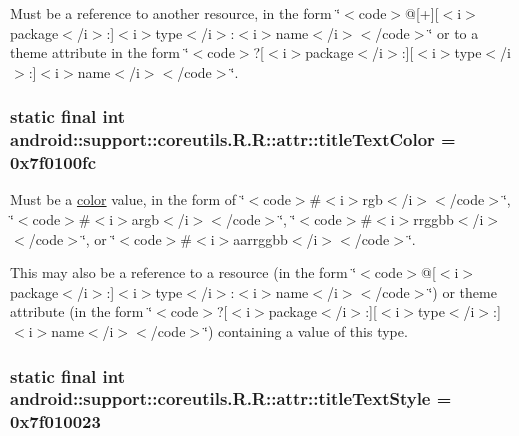 Must be a reference to another resource, in the form \char`\"{}$<$code$>$@\mbox{[}+\mbox{]}\mbox{[}$<$i$>$package$<$/i$>$:\mbox{]}$<$i$>$type$<$/i$>$:$<$i$>$name$<$/i$>$$<$/code$>$\char`\"{} or to a theme attribute in the form \char`\"{}$<$code$>$?\mbox{[}$<$i$>$package$<$/i$>$:\mbox{]}\mbox{[}$<$i$>$type$<$/i$>$:\mbox{]}$<$i$>$name$<$/i$>$$<$/code$>$\char`\"{}. \hypertarget{classandroid_1_1support_1_1coreutils_1_1_r_1_1attr_373e1d379bb1ab1c3df7a328d054c376}{
\subsubsection[{titleTextColor}]{\setlength{\rightskip}{0pt plus 5cm}static final int android::support::coreutils.R.R::attr::titleTextColor = 0x7f0100fc}}
\label{classandroid_1_1support_1_1coreutils_1_1_r_1_1attr_373e1d379bb1ab1c3df7a328d054c376}


Must be a \hyperlink{classandroid_1_1support_1_1coreutils_1_1_r_1_1color}{color} value, in the form of \char`\"{}$<$code$>$\#$<$i$>$rgb$<$/i$>$$<$/code$>$\char`\"{}, \char`\"{}$<$code$>$\#$<$i$>$argb$<$/i$>$$<$/code$>$\char`\"{}, \char`\"{}$<$code$>$\#$<$i$>$rrggbb$<$/i$>$$<$/code$>$\char`\"{}, or \char`\"{}$<$code$>$\#$<$i$>$aarrggbb$<$/i$>$$<$/code$>$\char`\"{}. 

This may also be a reference to a resource (in the form \char`\"{}$<$code$>$@\mbox{[}$<$i$>$package$<$/i$>$:\mbox{]}$<$i$>$type$<$/i$>$:$<$i$>$name$<$/i$>$$<$/code$>$\char`\"{}) or theme attribute (in the form \char`\"{}$<$code$>$?\mbox{[}$<$i$>$package$<$/i$>$:\mbox{]}\mbox{[}$<$i$>$type$<$/i$>$:\mbox{]}$<$i$>$name$<$/i$>$$<$/code$>$\char`\"{}) containing a value of this type. \hypertarget{classandroid_1_1support_1_1coreutils_1_1_r_1_1attr_2ec5869ea980be6c40bcc51259184de3}{
\subsubsection[{titleTextStyle}]{\setlength{\rightskip}{0pt plus 5cm}static final int android::support::coreutils.R.R::attr::titleTextStyle = 0x7f010023}}
\label{classandroid_1_1support_1_1coreutils_1_1_r_1_1attr_2ec5869ea980be6c40bcc51259184de3}



